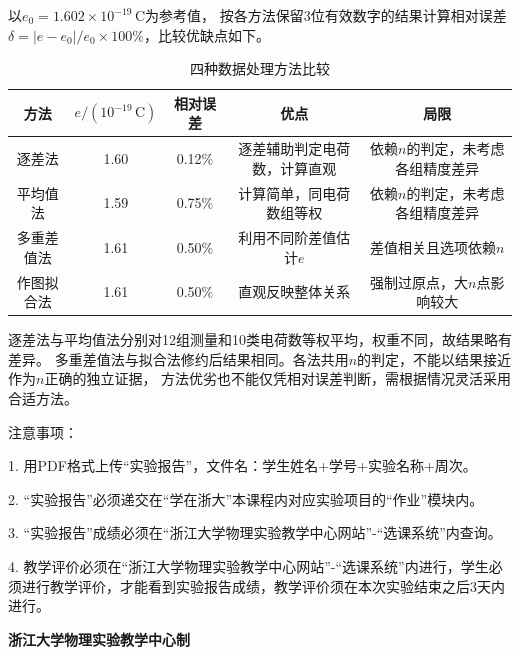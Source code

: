 \documentclass[10pt,a4paper]{ctexart} %
\begin{document}
    \par
    以$e_0=1.602\times10^{-19}\,\mathrm{C}$为参考值，
    按各方法保留3位有效数字的结果计算相对误差$\delta=|e-e_0|/e_0\times100\%$，比较优缺点如下。
    \begin{table}[H]
      \centering
      \caption{四种数据处理方法比较}
      {\small
      \setlength{\tabcolsep}{4pt}
      \begin{tabular}{ccccc}
        \toprule
        方法 & $e/(10^{-19}\,\mathrm{C})$ & 相对误差 & 优点 & 局限 \\
        \midrule
        逐差法 & 1.60 & 0.12\% & 逐差辅助判定电荷数，计算直观 & 依赖$n$的判定，未考虑各组精度差异 \\
        平均值法 & 1.59 & 0.75\% & 计算简单，同电荷数组等权 & 依赖$n$的判定，未考虑各组精度差异 \\
        多重差值法 & 1.61 & 0.50\% & 利用不同阶差值估计$e$ & 差值相关且选项依赖$n$ \\
        作图拟合法 & 1.61 & 0.50\% & 直观反映整体关系 & 强制过原点，大$n$点影响较大 \\
        \bottomrule
      \end{tabular}
      }
    \end{table}

    逐差法与平均值法分别对12组测量和10类电荷数等权平均，权重不同，故结果略有差异。
    多重差值法与拟合法修约后结果相同。各法共用$n$的判定，不能以结果接近作为$n$正确的独立证据，
    方法优劣也不能仅凭相对误差判断，需根据情况灵活采用合适方法。
    \endgroup

\vspace*{\fill} %
\noindent
\begin{minipage}{\textwidth}
  注意事项：

  \begingroup
    \setlength{\leftskip}{2em} %
    1. 用PDF格式上传“实验报告”，文件名：学生姓名+学号+实验名称+周次。

    2. “实验报告”必须递交在“学在浙大”本课程内对应实验项目的“作业”模块内。

    3. “实验报告”成绩必须在“浙江大学物理实验教学中心网站”-“选课系统”内查询。

    4. 教学评价必须在“浙江大学物理实验教学中心网站”-“选课系统”内进行，学生必须进行教学评价，才能看到实验报告成绩，教学评价须在本次实验结束之后3天内进行。\par
  \endgroup

  \begin{center}
    {\bfseries 浙江大学物理实验教学中心制}
  \end{center}
\end{minipage}
\end{document}
